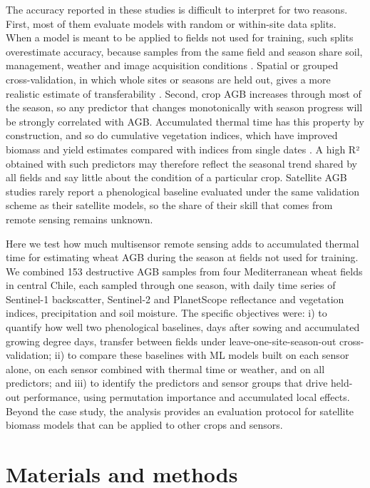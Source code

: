 \documentclass[
  british,
]{interact}
\begin{document}
The accuracy reported in these studies is difficult to interpret for two
reasons. First, most of them evaluate models with random or within-site
data splits. When a model is meant to be applied to fields not used for
training, such splits overestimate accuracy, because samples from the
same field and season share soil, management, weather and image
acquisition conditions \citep{Roberts2017, Ploton2020}. Spatial or
grouped cross-validation, in which whole sites or seasons are held out,
gives a more realistic estimate of transferability \citep{Meyer2021}.
Second, crop AGB increases through most of the season, so any predictor
that changes monotonically with season progress will be strongly
correlated with AGB. Accumulated thermal time has this property by
construction, and so do cumulative vegetation indices, which have
improved biomass and yield estimates compared with indices from single
dates \citep{PeroniVenancio2020}. A high R² obtained with such
predictors may therefore reflect the seasonal trend shared by all fields
and say little about the condition of a particular crop. Satellite AGB
studies rarely report a phenological baseline evaluated under the same
validation scheme as their satellite models, so the share of their skill
that comes from remote sensing remains unknown.

Here we test how much multisensor remote sensing adds to accumulated
thermal time for estimating wheat AGB during the season at fields not
used for training. We combined 153 destructive AGB samples from four
Mediterranean wheat fields in central Chile, each sampled through one
season, with daily time series of Sentinel-1 backscatter, Sentinel-2 and
PlanetScope reflectance and vegetation indices, precipitation and soil
moisture. The specific objectives were: i) to quantify how well two
phenological baselines, days after sowing and accumulated growing degree
days, transfer between fields under leave-one-site-season-out
cross-validation; ii) to compare these baselines with ML models built on
each sensor alone, on each sensor combined with thermal time or weather,
and on all predictors; and iii) to identify the predictors and sensor
groups that drive held-out performance, using permutation importance and
accumulated local effects. Beyond the case study, the analysis provides
an evaluation protocol for satellite biomass models that can be applied
to other crops and sensors.

\section{Materials and methods}\label{materials-and-methods}
\end{document}
